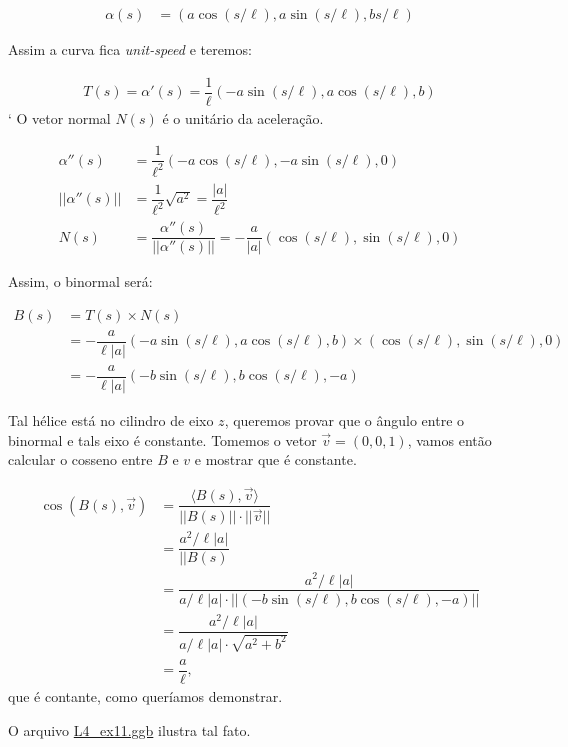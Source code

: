 \documentclass[12pt,letterpaper]{article}
\begin{document}
\begin{enumerate}
	\begin{align*}
		\alpha(s)&=\left(a\cos\left(s/\ell\right),a\sin\left(s/\ell\right),bs/{\ell}\right)
	\end{align*}
	
	Assim a curva fica \textit{unit-speed} e teremos:
	
	\begin{align*}
		T(s)=\alpha'(s)=\dfrac1\ell(-a\sin(s/\ell),a\cos(s/\ell),b)
	\end{align*}
	`
	O vetor normal $N(s)$ é o unitário da aceleração. 
	
	\begin{align*}
		\alpha''(s)&=\dfrac{1}{\ell^2}(-a\cos(s/\ell),-a\sin(s/\ell),0)\\
		||\alpha''(s)||&=\dfrac{1}{\ell^2}\sqrt{a^2}=\dfrac{|a|}{\ell^2}\\
		N(s)&=\dfrac{\alpha''(s)}{||\alpha''(s)||}=-\dfrac{a}{|a|}(\cos(s/\ell),\sin(s/\ell),0)
	\end{align*}
	
	Assim, o binormal será:
	
	\begin{align*}
		B(s)&=T(s)\times N(s)\\
		&=-\dfrac{a}{\ell|a|}(-a\sin(s/\ell),a\cos(s/\ell),b)\times(\cos(s/\ell),\sin(s/\ell),0)\\
		&=-\dfrac{a}{\ell|a|}(-b\sin(s/\ell),b\cos(s/\ell),-a)
	\end{align*}

	Tal hélice está no cilindro de eixo $z$, queremos provar que o ângulo entre o binormal e tals eixo é constante. Tomemos o vetor $\vec v=(0,0,1)$, vamos então calcular o cosseno entre $B$ e $v$ e mostrar que é constante.
	
	\begin{align*}
		\cos(B(s),\vec v)&=\dfrac{\langle B(s),\vec v\rangle}{||B(s)||\cdot||\vec v||}\\
		&=\dfrac{a^2/\ell|a|}{||B(s)}\\
		&=\dfrac{a^2/\ell|a|}{a/\ell|a|\cdot ||(-b\sin(s/\ell),b\cos(s/\ell),-a)||}\\
		&=\dfrac{a^2/\ell|a|}{a/\ell|a|\cdot \sqrt{a^2+b^2}}\\
		&=\dfrac{a}{\ell},
	\end{align*}
	que é contante, como queríamos demonstrar.
	
	O arquivo \href{https://github.com/reneroliveira/Curves_and_Surfaces/blob/main/ggb_files/L4_ex11.ggb}{L4\_ex11.ggb} ilustra tal fato.
	

\end{enumerate}
\end{document}
